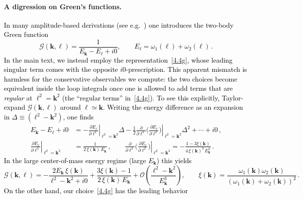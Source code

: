\paragraph{A digression on Green's functions.}
\textcolor{black}{In many amplitude-based derivations (see e.g.~\cite{Cristofoli:2019neg}) one introduces the two-body Green
function
\begin{equation}
  \mathcal{G}(\boldsymbol{k},\boldsymbol{\ell})
  =\frac{1}{E_{\boldsymbol{k}}-E_{\boldsymbol{\ell}}+i0},
  \qquad
  E_{\boldsymbol{\ell}}=\omega_1(\boldsymbol{\ell})+\omega_2(\boldsymbol{\ell})\, .
\end{equation}
In the main text, we instead employ the representation~\eqref{4.4g}, whose leading singular term comes
with the opposite $i0$-prescription. This apparent mismatch is harmless for the conservative observables
we compute: the two choices become equivalent inside the loop integrals once one is allowed to add
terms that are \emph{regular} at $\boldsymbol{\ell}^{2}=\boldsymbol{k}^{2}$ (the ``regular terms'' in~\eqref{4.4g}).
To see this explicitly, Taylor-expand $\mathcal{G}(\boldsymbol{k},\boldsymbol{\ell})$ around
$\boldsymbol{\ell}\simeq\boldsymbol{k}$. Writing the energy difference as an expansion in
$\Delta\equiv(\boldsymbol{\ell}^{2}-\boldsymbol{k}^{2})$, one finds}
\textcolor{black}{\begin{align}
  E_{\boldsymbol{k}}-E_{\boldsymbol{\ell}}+i0
  &=
  -\left.\frac{\partial E_{\boldsymbol{\ell}}}{\partial \boldsymbol{\ell}^{2}}\right|_{\boldsymbol{\ell}^{2}=\boldsymbol{k}^{2}} \Delta
  -\frac12\left.\frac{\partial}{\partial \boldsymbol{\ell}^{2}}
  \Big(\frac{\partial E_{\boldsymbol{\ell}}}{\partial \boldsymbol{\ell}^{2}}\Big)\right|_{\boldsymbol{\ell}^{2}=\boldsymbol{k}^{2}}\Delta^{2}
  +\cdots + i0\,, \nonumber\\[2pt]
  \left.\frac{\partial E_{\boldsymbol{\ell}}}{\partial \boldsymbol{\ell}^{2}}\right|_{\boldsymbol{\ell}^{2}=\boldsymbol{k}^{2}}
  &=\frac{1}{2\,\xi(\boldsymbol{k})\,E_{\boldsymbol{k}}}\,,\qquad
  \left.\frac{\partial}{\partial \boldsymbol{\ell}^{2}}
  \Big(\frac{\partial E_{\boldsymbol{\ell}}}{\partial \boldsymbol{\ell}^{2}}\Big)\right|_{\boldsymbol{\ell}^{2}=\boldsymbol{k}^{2}}
  =-\frac{1-3\xi(\boldsymbol{k})}{4\,\xi(\boldsymbol{k})^{3}\,E_{\boldsymbol{k}}^{3}}\, .
\end{align}}
\textcolor{black}{
In the large center-of-mass energy regime (large $E_{\boldsymbol{k}}$) this yields
\begin{equation}
  \mathcal{G}(\boldsymbol{k},\boldsymbol{\ell})
  =-\frac{2E_{\boldsymbol{k}}\,\xi(\boldsymbol{k})}{\boldsymbol{\ell}^{2}-\boldsymbol{k}^{2}+i0}
  +\frac{3\xi(\boldsymbol{k})-1}{2\,\xi(\boldsymbol{k})\,E_{\boldsymbol{k}}}
  +\mathcal{O}\!\left(\frac{\boldsymbol{\ell}^{2}-\boldsymbol{k}^{2}}{E_{\boldsymbol{k}}^{3}}\right),
  \qquad
  \xi(\boldsymbol{k})=\frac{\omega_1(\boldsymbol{k})\omega_2(\boldsymbol{k})}{(\omega_1(\boldsymbol{k})+\omega_2(\boldsymbol{k}))^{2}}\, .
  \label{eq:Gexp-large-s}
\end{equation}
On the other hand, our choice~\eqref{4.4g} has the leading behavior}
